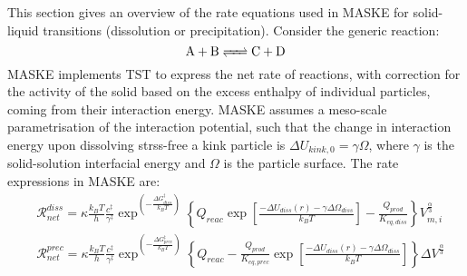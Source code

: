 \documentclass[12pt]{paper}    %
\newcommand{\RR}{\mathscr{R}}
\begin{document}
This section gives an overview of the rate equations used in MASKE for solid-liquid transitions (dissolution or precipitation). Consider the generic reaction: 
%
\begin{equation}
\ce{A + B <=> C + D}
\end{equation}
%
MASKE implements TST to express the net rate of reactions, with correction for the activity of the solid based on the excess enthalpy of individual particles, coming from their interaction energy. MASKE assumes a meso-scale parametrisation of the interaction potential, such that the change in interaction energy upon dissolving strss-free a kink particle is $\Delta U_{kink,0} = \gamma \Omega$, where $\gamma$ is the solid-solution interfacial energy and $\Omega$ is the particle surface. The rate expressions in MASKE are:
%
\begin{align}
&\RR_{net}^{diss} = \kappa \frac{k_B T}{h}\frac{c^\ddag}{\gamma^\ddag}\exp^{\left(-\frac{\Delta G^\ddag_{diss}}{k_BT}\right)}\left\{Q_{reac}\exp\left[\frac{-\Delta U_{diss}(r)-\gamma\Delta\Omega_{diss}}{k_BT}\right]-\frac{Q_{prod}}{K_{eq,diss}}\right\} V_{m,i}^{\frac{\alpha}{3}}    \label{EqRdiss}  \\
%
&\RR_{net}^{prec} = \kappa \frac{k_B T}{h}\frac{c^\ddag}{\gamma^\ddag}\exp^{\left(-\frac{\Delta G^\ddag_{prec}}{k_BT}\right)}\left\{Q_{reac}-\frac{Q_{prod}}{K_{eq,prec}}\exp\left[\frac{-\Delta U_{diss}(r)-\gamma\Delta\Omega_{diss}}{k_BT}\right]\right\} \Delta V^{\frac{\alpha}{3}}    \label{EqRprec}
\end{align}
%
\end{document}

